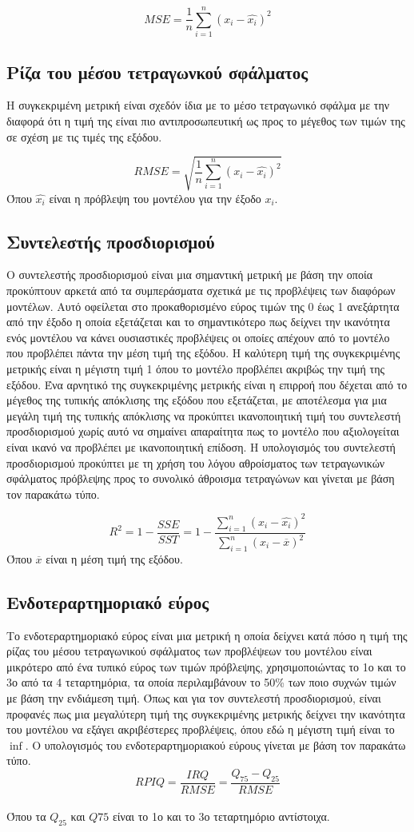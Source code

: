 $$MSE=\frac{1}{n}\sum_{i=1}^{n} {\left(x_{i}-\hat{x_{i}}\right)}^2$$

\subsection{Ρίζα του μέσου τετραγωνκού σφάλματος}
Η συγκεκριμένη μετρική είναι σχεδόν ίδια με το μέσο τετραγωνικό σφάλμα με την διαφορά ότι η τιμή της είναι πιο αντιπροσωπευτική ως προς το μέγεθος των τιμών της σε σχέση με τις τιμές της εξόδου.

$$RMSE=\sqrt{\frac{1}{n}\sum_{i=1}^{n} {\left(x_{i}-\hat{x_{i}}\right)}^2}$$
Όπου $\hat{x_{i}}$ είναι η πρόβλεψη του μοντέλου για την έξοδο $x_i$.

\subsection{Συντελεστής προσδιορισμού}
Ο συντελεστής προσδιορισμού  είναι μια σημαντική μετρική με βάση την οποία προκύπτουν αρκετά από τα συμπεράσματα σχετικά με τις προβλέψεις των διαφόρων μοντέλων. Αυτό οφείλεται στο προκαθορισμένο εύρος τιμών της 0 έως 1 ανεξάρτητα από την έξοδο η οποία εξετάζεται και το σημαντικότερο πως δείχνει την ικανότητα ενός μοντέλου να κάνει ουσιαστικές προβλέψεις οι οποίες απέχουν από το μοντέλο που προβλέπει πάντα την μέση τιμή της εξόδου. Η καλύτερη τιμή της συγκεκριμένης μετρικής είναι η μέγιστη τιμή 1 όπου το μοντέλο προβλέπει ακριβώς την τιμή της εξόδου. Ένα αρνητικό της συγκεκριμένης μετρικής είναι η επιρροή που δέχεται από το μέγεθος της τυπικής απόκλισης της εξόδου που εξετάζεται, με αποτέλεσμα για μια μεγάλη τιμή της τυπικής απόκλισης να προκύπτει ικανοποιητική τιμή του συντελεστή προσδιορισμού χωρίς αυτό να σημαίνει απαραίτητα πως το μοντέλο που αξιολογείται είναι ικανό να προβλέπει με ικανοποιητική επίδοση. Η υπολογισμός του συντελεστή προσδιορισμού προκύπτει με τη χρήση του λόγου αθροίσματος των τετραγωνικών σφάλματος πρόβλεψης  προς το συνολικό άθροισμα τετραγώνων  και γίνεται με βάση τον παρακάτω τύπο.

$$R^2=1-\frac{SSE}{SST}=1-\frac{\sum_{i=1}^{n} {\left(x_{i}-\hat{x_{i}}\right)}^2}{\sum_{i=1}^{n} {\left(x_{i}-\overline{x}\right)}^2}$$
Όπου $\overline{x}$ είναι η μέση τιμή της εξόδου.

\subsection{Ενδοτεραρτημοριακό εύρος}
Το ενδοτεραρτημοριακό εύρος είναι μια μετρική η οποία δείχνει κατά πόσο η τιμή της ρίζας του μέσου τετραγωνικού σφάλματος των προβλέψεων του μοντέλου είναι μικρότερο από ένα τυπικό εύρος των τιμών πρόβλεψης, χρησιμοποιώντας το 1ο και το 3ο από τα 4 τεταρτημόρια, τα οποία περιλαμβάνουν το 50\% των ποιο συχνών τιμών με βάση την ενδιάμεση τιμή. Όπως και για τον συντελεστή προσδιορισμού, είναι προφανές πως μια μεγαλύτερη τιμή της συγκεκριμένης μετρικής δείχνει την ικανότητα του μοντέλου να εξάγει ακριβέστερες προβλέψεις, όπου εδώ η μέγιστη τιμή είναι το $\inf$. Ο υπολογισμός του ενδοτεραρτημοριακού εύρους γίνεται με βάση τον παρακάτω τύπο.\\

$$RPIQ=\frac{IRQ}{RMSE}=\frac{Q_{75}-Q_{25}}{RMSE}$$ \\
Όπου τα $Q_{25}$ και $Q{75}$ είναι το 1ο και το 3ο τεταρτημόριο αντίστοιχα.

